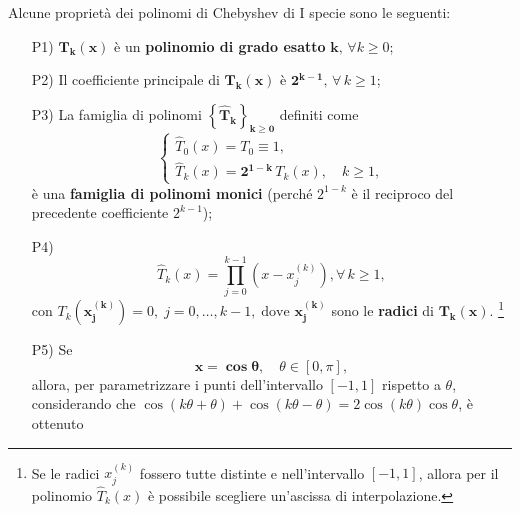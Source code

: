 \begin{property}
	Alcune proprietà dei polinomi di Chebyshev di I specie sono le seguenti:
	\begin{itemize}
		\item [P1)] $\boldsymbol{T_k(x)}$ è un \textbf{polinomio di grado esatto} $\boldsymbol k,\,\forall k\geq 0$;
		\item[P2)]\footnotemark Il coefficiente principale di $\boldsymbol{T_k(x)}$ è $\boldsymbol{2^{k-1}},\,\forall\,k\geq 1$;
		\item[P3)]\footnotemark La famiglia di polinomi $\boldsymbol{\left\{\widehat T_k\right\}_{k\geq 0}}$ definiti come
		\begin{equation}\label{eq:famiglia_polinomi_monici}
			\begin{cases}
				\widehat T_0(x)=T_0\equiv 1,\\
				\widehat T_k(x) =\boldsymbol{2^{1-k}}\, T_k(x),\quad k\geq 1,
			\end{cases}
		\end{equation}
		è una \textbf{famiglia di polinomi monici} (perché $2^{1-k}$ è il reciproco del precedente coefficiente $2^{k-1}$);
		\item[P4)] 
		\begin{equation}\label{eq:polinomio_monicizzato}
			\widehat T_k(x)=\prod_{j=0}^{k-1}\left(x-x_j^{(k)}\right), \forall\, k\geq 1,
		\end{equation}
		con $T_k\left(\boldsymbol{x_j^{(k)}}\right)=0,\; j=0,\hdots,k-1,\;\text{dove } \boldsymbol{x_j^{(k)}}$ sono le \textbf{radici} di $\boldsymbol{T_k(x)}$. \footnote{Se le radici $x_j^{(k)}$ fossero tutte distinte e nell'intervallo $[-1,1]$, allora per il polinomio $\widehat T_k(x)$ è possibile scegliere un'ascissa di interpolazione.}
		 \item[P5)] Se 
		 \begin{equation*}
		 	\boldsymbol{x=\cos\theta},\quad \theta\in [0,\pi],
		 \end{equation*}
		 allora, per parametrizzare i punti dell'intervallo $[-1,1]$ rispetto a $\theta$, considerando che $\cos(k \theta + \theta) + \cos(k \theta - \theta) = 2\cos (k\theta) \cos \theta$, è ottenuto

\end{itemize}
\end{property}
